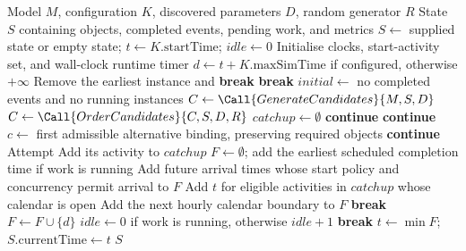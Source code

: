 \begin{algorithm}[tbp]
\caption{Object-centric discrete-event simulation}
\label{alg:object-centric-discrete-event-simulation}
\small
\begin{algorithmic}[1]
\Require Model $M$, configuration $K$, discovered parameters $D$, random generator $R$
\Ensure State $S$ containing objects, completed events, pending work, and metrics
\State $S \gets$ supplied state or empty state; $t \gets K.\mathrm{startTime}$; $idle \gets 0$
\State Initialise clocks, start-activity set, and wall-clock runtime timer
\State $d \gets t + K.\mathrm{maxSimTime}$ if configured, otherwise $+\infty$
        \State Remove the earliest instance and 
         \State \textbf{break} \EndIf
    \EndWhile
     \State \textbf{break} \EndIf
    \State $initial \gets$ no completed events and no running instances
    \State $C \gets \Call{GenerateCandidates}{M,S,D}$ 
    \State $C \gets \Call{OrderCandidates}{C,S,D,R}$
    \State $catchup \gets \emptyset$
         \State \textbf{continue} \EndIf
            \State \textbf{continue}
        \EndIf
            \State $c \gets$ first admissible alternative binding, preserving required objects
             \State \textbf{continue} \EndIf
        \EndIf
        \State Attempt 
            \State Add its activity to $catchup$
        \EndIf
    \EndFor
    \State $F \gets \emptyset$; add the earliest scheduled completion time if work is running
    \State Add future arrival times whose start policy and concurrency permit arrival to $F$
    \State Add $t$ for eligible activities in $catchup$ whose calendar is open
        \State Add the next hourly calendar boundary to $F$
    \EndIf
     \State \textbf{break} \EndIf
     \State $F \gets F\cup\{d\}$ \EndIf
    \State $idle \gets 0$ if work is running, otherwise $idle+1$
     \State \textbf{break} \EndIf
    \State $t \gets \min F$; $S.\mathrm{currentTime} \gets t$
\EndWhile
\State \Return $S$
\end{algorithmic}
\end{algorithm}
